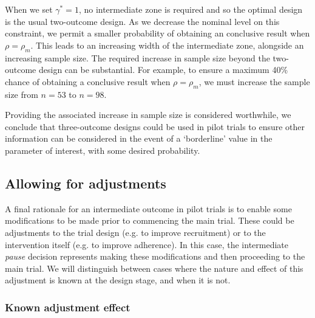 \documentclass[sagev]{sagej}
\begin{document}
When we set $\gamma^* = 1$, no intermediate zone is required and so the optimal design is the usual two-outcome design. As we decrease the nominal level on this constraint, we permit a smaller probability of obtaining an conclusive result when $\rho = \rho_m$. This leads to an increasing width of the intermediate zone, alongside an increasing sample size. The required increase in sample size beyond the two-outcome design can be substantial. For example, to ensure a maximum 40\% chance of obtaining a conclusive result when $\rho = \rho_m$, we must increase the sample size from $n = 53$ to $n = 98$. 

Providing the associated increase in sample size is considered worthwhile, we conclude that three-outcome designs could be used in pilot trials to ensure other information can be considered in the event of a `borderline' value in the parameter of interest, with some desired probability.

\subsection{Allowing for adjustments}

A final rationale for an intermediate outcome in pilot trials is to enable some modifications to be made prior to commencing the main trial. These could be adjustments to the trial design (e.g. to improve recruitment) or to the intervention itself (e.g. to improve adherence). In this case, the intermediate \emph{pause} decision represents making these modifications and then proceeding to the main trial. We will distinguish between cases where the nature and effect of this adjustment is known at the design stage, and when it is not.

\subsubsection{Known adjustment effect}
\end{document}
